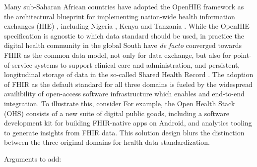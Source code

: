 \documentclass[
  authoryear]{elsarticle}
\begin{document}
Many sub-Saharan African countries have adopted the OpenHIE framework
\citep{openhie} as the architectural blueprint for implementing
nation-wide health information exchanges (HIE) \citep{mamuye2022health},
including Nigeria \citep{dalhatu2023paper}, Kenya
\citep{thaiya2021adoption} and Tanzania \citep{nsaghurwe2021one}. While
the OpenHIE specification is agnostic to which data standard should be
used, in practice the digital health community in the global South have
\emph{de facto} converged towards FHIR as the common data model, not
only for data exchange, but also for point-of-service systems to support
clinical care and administration, and persistent, longitudinal storage
of data in the so-called Shared Health Record
\citep{ohie2023unconference}. The adoption of FHIR as the default
standard for all three domains is fueled by the widespread availibility
of open-access software infrastructure which enables and end-to-end
integration. To illustrate this, consider For example, the Open Health
Stack (OHS) consists of a new suite of digital public goods, including a
software development kit for building FHIR-native apps on Android, and
analytics tooling to generate insights from FHIR data. This solution
design blurs the distinction between the three original domains for
health data standardization.

Arguments to add:
\end{document}

